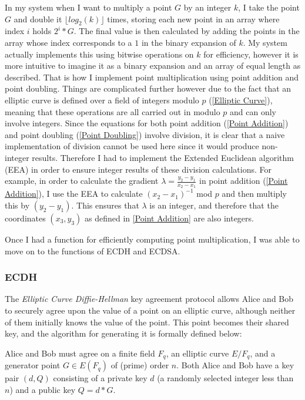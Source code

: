 \documentclass[12pt,a4paper]{article}
\begin{document}
In my system when I want to multiply a point $G$ by an integer $k$, 
I take the point $G$ and double it $\lfloor log_2(k) \rfloor$ times, storing each new point in an array where index $i$ holds $2^i * G$. 
The final value is then calculated by adding the points in the array whose index corresponds to a $1$ in the binary expansion of $k$. 
My system actually implements this using bitwise operations on $k$ for efficiency, 
however it is more intuitive to imagine it as a binary expansion and an array of equal length as described. 
That is how I implement point multiplication using point addition and point doubling. 
Things are complicated further however due to the fact that an elliptic curve is defined over a field of integers modulo $p$ (\ref{Elliptic Curve}), 
meaning that these operations are all carried out in modulo $p$ and can only involve integers. 
Since the equations for both point addition (\ref{Point Addition}) and point doubling (\ref{Point Doubling}) involve division, 
it is clear that a naive implementation of division cannot be used here since it would produce non-integer results. 
Therefore I had to implement the Extended Euclidean algorithm (EEA) in order to ensure integer results of these division calculations. 
For example, in order to calculate the gradient $\lambda = \frac{y_2-y_1}{x_2-x_1}$ in point addition (\ref{Point Addition}), 
I use the EEA to calculate $(x_2-x_1)^{-1}$ mod $p$ and then multiply this by $(y_2-y_1)$. 
This ensures that $\lambda$ is an integer, and therefore that the coordinates $(x_3,y_3)$ as defined in \ref{Point Addition} 
are also integers. 

Once I had a function for efficiently computing point multiplication, I was able to move on to the functions of ECDH and ECDSA. 

\subsubsection{ECDH} \label{ECDH}
The \emph{Elliptic Curve Diffie-Hellman} key agreement protocol allows Alice and Bob 
to securely agree upon the value of a point on an elliptic curve, although neither of them initially knows the value of the point. 
This point becomes their shared key, and the algorithm for generating it is formally defined below: 

Alice and Bob must agree on a finite field $F_q$, an elliptic curve $E/F_q$, and a generator point $G \in E(F_q)$  of (prime) order $n$.
Both Alice and Bob have a key pair $(d,Q)$ consisting of a private key $d$ (a randomly selected integer less than $n$) 
and a public key $Q = d * G$.
\end{document}
